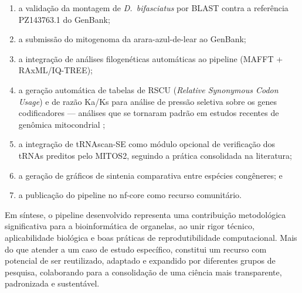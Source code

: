 \begin{enumerate}[label=(\roman*)]
    \item a validação da montagem de \textit{D.~bifasciatus} por BLAST contra a referência PZ143763.1 do GenBank;
    \item a submissão do mitogenoma da arara-azul-de-lear ao GenBank;
    \item a integração de análises filogenéticas automáticas ao pipeline (MAFFT + RAxML/\allowbreak IQ-TREE);
    \item a geração automática de tabelas de RSCU (\textit{Relative Synonymous Codon Usage}) e de razão Ka/Ks para análise de pressão seletiva sobre os genes codificadores --- análises que se tornaram padrão em estudos recentes de genômica mitocondrial \cite{zhan2024,kundu2024,shi2024};
    \item a integração de tRNAscan-SE como módulo opcional de verificação dos tRNAs preditos pelo MITOS2, seguindo a prática consolidada na literatura;
    \item a geração de gráficos de sintenia comparativa entre espécies congêneres; e
    \item a publicação do pipeline no nf-core como recurso comunitário.
\end{enumerate}

Em síntese, o pipeline desenvolvido representa uma contribuição metodológica significativa para a bioinformática de organelas, ao unir rigor técnico, aplicabilidade biológica e boas práticas de reprodutibilidade computacional. Mais do que atender a um caso de estudo específico, constitui um recurso com potencial de ser reutilizado, adaptado e expandido por diferentes grupos de pesquisa, colaborando para a consolidação de uma ciência mais transparente, padronizada e sustentável.

